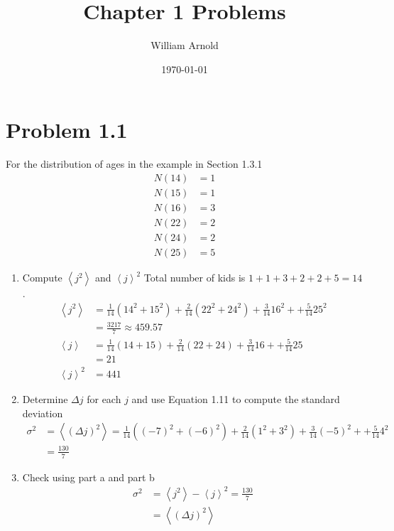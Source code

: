 \documentclass{article}
\title{Chapter 1 Problems}
\author{William Arnold}
\date\today
\newcommand{\braket}[1]{\left\langle #1 \right\rangle}
\begin{document}
\maketitle 

\section*{Problem 1.1}
For the distribution of ages in the example in Section 1.3.1
\begin{align*}
  N(14) &= 1 \\
  N(15) &= 1 \\
  N(16) &= 3 \\
  N(22) &= 2 \\
  N(24) &= 2 \\
  N(25) &= 5
\end{align*}

\begin{enumerate}[label=(\alph*)]
  \item Compute $\braket{j^2}$ and $\braket{j}^2$
    Total number of kids is $1 + 1 + 3 + 2 + 2 + 5 = 14$. 
    \begin{align*}
      \braket{j^2} &= \frac{1}{14}(14^2 + 15^2) + \frac{2}{14}(22^2 + 24^2) + \frac{3}{14}16^2 + + \frac{5}{14}25^2 \\
                   &= \frac{3217}{7} \approx 459.57  \\
      \braket{j} &= \frac{1}{14}(14 + 15) + \frac{2}{14}(22 + 24) + \frac{3}{14}16 + + \frac{5}{14}25 \\
                   &= 21 \\
      \braket{j}^2 &= 441
    \end{align*}
  \item Determine $\Delta j$ for each $j$ and use Equation 1.11 to compute the standard deviation
    \begin{align*}
      \sigma^2 &= \braket{(\Delta j)^2} = \frac{1}{14}((-7)^2 + (-6)^2) + \frac{2}{14}(1^2 + 3^2) + \frac{3}{14}(-5)^2 + + \frac{5}{14}4^2 \\
               &= \frac{130}{7}
    \end{align*}

  \item Check using part a and part b 
    \begin{align*}
      \sigma^2 &= \braket{j^2} - \braket{j}^2 = \frac{130}{7} \\
               &= \braket{(\Delta j)^2} 
    \end{align*}
\end{enumerate}
\end{document}
